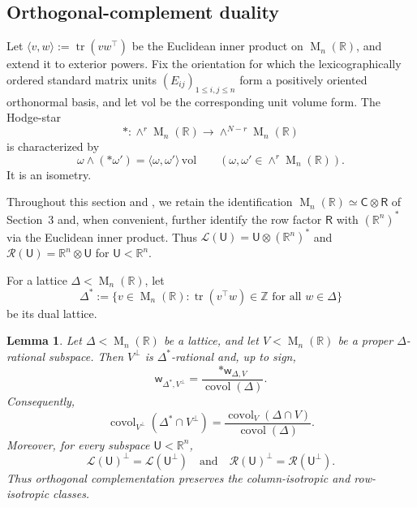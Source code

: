 \documentclass[reqno,11pt]{amsart}
\numberwithin{equation}{section}
\newtheorem{lemma}[theorem]{Lemma}
\theoremstyle{definition}
\theoremstyle{remark}
\newcommand{\op}{\operatorname}
\newcommand{\R}{\mathbb R}
\newcommand{\br}{\mathbb R}
\newcommand{\M}{\op{M}}
\newcommand{\covol}{\op{covol}}
\begin{document}
\subsection{Orthogonal-complement duality}
Let $\langle v,w\rangle:=\operatorname{tr}(vw^{\intercal})
$ be the Euclidean inner product on $\M_n(\R)$, and extend it to exterior
powers. Fix the orientation for which the lexicographically ordered standard matrix units $(E_{ij})_{1\le i,j\le n}$ form a positively oriented
orthonormal basis, and let $\mathrm{vol}$ be the corresponding unit volume
form.  The Hodge-star
$$
\ast:\wedge^r\M_n(\R)\to\wedge^{N-r}\M_n(\R)
$$
is characterized by
$$
\omega\wedge(\ast \omega')
=
\langle\omega,\omega'\rangle\,\mathrm{vol} \qquad
\left(\omega,\omega'\in\wedge^r\M_n(\R)\right).
$$
It is an isometry. 

Throughout this section and , we retain the
identification $\M_n(\R)\simeq\mathsf C\otimes\mathsf R$ of Section~3
and, when convenient, further identify the row factor $\mathsf R$ with
$(\R^n)^*$ via the Euclidean inner product. Thus
$\mathcal L(\mathsf U)=\mathsf U\otimes(\R^n)^*$ and $\mathcal R(\mathsf U)=\R^n\otimes \mathsf U$ for
$\mathsf U<\R^n$.



For a lattice $\Delta<\M_n(\br)$, let
$$
\Delta^*
:=
\{v\in\M_n(\mathbb R):\operatorname{tr}(v^{\intercal}w)\in\mathbb Z
\text{ for all }w\in\Delta\}
$$
be its dual lattice.

\begin{lemma}\label{lem:lattice-orthogonal-duality}
Let $\Delta<\M_n(\R)$ be a lattice, and let
$V<\M_n(\R)$ be a proper $\Delta$-rational subspace. Then $V^\perp$ is $\Delta^*$-rational and, up to sign,
\begin{equation}\label{eq:hodge-plucker-duality}
\mathsf w_{\Delta^*,V^\perp}
=
\frac{\ast\mathsf w_{\Delta,V}}{\covol(\Delta)}.
\end{equation}
Consequently,
\begin{equation}\label{eq:covol-orthogonal-duality}
\covol_{V^\perp}(\Delta^*\cap V^\perp)
=
\frac{\covol_V(\Delta\cap V)}{\covol(\Delta)}.
\end{equation}
Moreover, for every subspace $\mathsf U<\R^n$,
$$
\mathcal L(\mathsf U)^\perp=\mathcal L(\mathsf U^\perp)
\quad\text{and}\quad
\mathcal R(\mathsf U)^\perp=\mathcal R(\mathsf U^\perp).
$$
 Thus orthogonal complementation preserves the column-isotropic and
row-isotropic classes.
\end{lemma}
\end{document}
